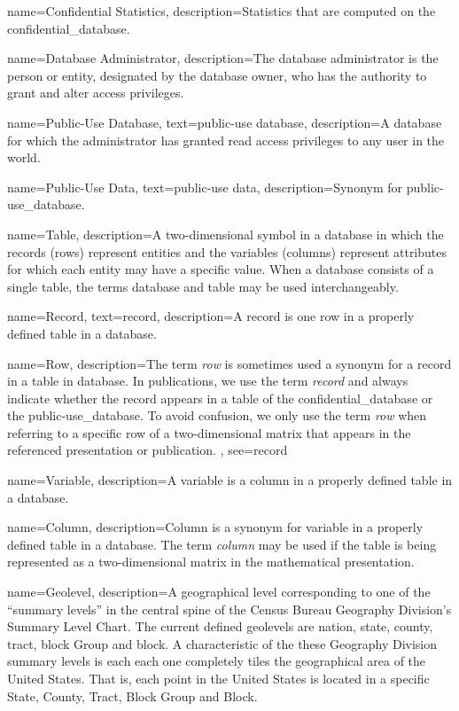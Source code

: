 {
    name=Confidential Statistics,
    description={Statistics that are computed on the \gls{confidential_database}.}
}

{
    name=Database Administrator,
    description={The database administrator is the person or entity, designated by the database owner, who has the authority to grant and alter access privileges.}
}

{
    name=Public-Use Database,
    text=public-use database,
    description={A \gls{database} for which the administrator has granted read access privileges to any user in the world.}
}

{
    name=Public-Use Data,
    text=public-use data,
    description={Synonym for \gls{public-use_database}.}
}

{
    name=Table,
    description={A two-dimensional symbol in a database in which the \glspl{record} (rows) represent entities and the variables (columns) represent attributes for which each entity may have a specific value. When a database consists of a single table, the terms database and table may be used interchangeably.}
}

{
    name=Record,
    text=record,
    description={A record is one row in a properly defined table in a database.}
}

{
    name=Row,
    description={The term \textit{row} is sometimes used a synonym for a \gls{record} in a table in database. In publications, we  use the term \textit{record} and  always indicate whether the record appears in a table of the \gls{confidential_database} or the \gls{public-use_database}. To avoid confusion, we only use the term \textit{row} when referring to a specific row of a two-dimensional matrix that appears in the referenced presentation or publication. },
    see={record}
}

{
    name=Variable,
    description={A variable is a column in a properly defined table in a database.}
}

{
    name=Column,
    description={Column is a synonym for variable in a properly defined table in a database. The term \textit{column} may be used if the table is being represented as a two-dimensional matrix in the mathematical presentation.}
}

{
    name=Geolevel,
    description={A geographical level corresponding to one of the  ``summary levels'' in the central spine of the Census Bureau Geography Division's Summary Level Chart. The current defined geolevels are nation, state, county, tract, block Group and block. A characteristic of the these Geography Division summary levels is each each one completely tiles the geographical area of the United States. That is, each point in the United States is located in a specific State, County, Tract, Block Group and Block.}
}

